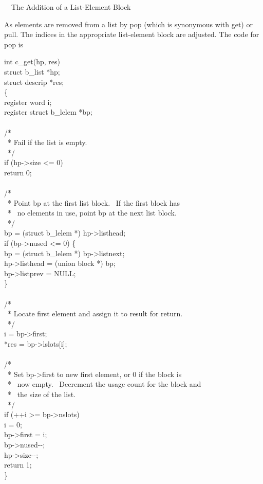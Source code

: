\ \ The Addition of a List-Element Block


As elements are removed from a list by pop (which is synonymous with
get) or pull. The indices in the appropriate list-element block are
adjusted. The code for pop is

\begin{iconcode}
int c\_get(hp, res)\\
struct b\_list *hp;\\
struct descrip *res;\\
\{\\
\>register word i;\\
\>register struct b\_lelem *bp;\\
\\
\>/*\\
\>\ * Fail if the list is empty.\\
\>\ */\\
\>if (hp->size <= 0)\\
\>\>return 0;\\
\\
\>/*\\
\>\ * Point bp at the first list block. \ If the first block has\\
\>\ * \ no elements in use, point bp at the next list block.\\
\>\ */\\
\>bp = (struct b\_lelem *) hp->listhead;\\
\>if (bp->nused <= 0) \{\\
\>\>bp = (struct b\_lelem *) bp->listnext;\\
\>\>hp->listhead = (union block *) bp;\\
\>\>bp->listprev = NULL;\\
\>\>\}\\
\\
\>/*\\
\>\ * Locate first element and assign it to result for return.\\
\>\ */\\
\>i = bp->first;\\
\>*res = bp->lslots[i];\\
\\
\>/*\\
\>\ * Set bp->first to new first element, or 0 if the block is\\
\>\ * \ now empty. \ Decrement the usage count for the block and\\
\>\ * \ the size of the list.\\
\>\ */\\
\>if (++i >= bp->nslots)\\
\>\>i = 0;\\
\>bp->first = i;\\
\>bp->nused-{}-;\\
\>hp->size-{}-;\\
\>return 1;\\
\}
\end{iconcode}

